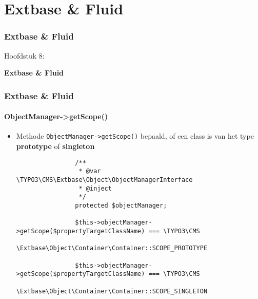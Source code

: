 %

\section{Extbase \& Fluid}
\begin{frame}[fragile]
	\frametitle{Extbase \& Fluid}

	\begin{center}\huge{Hoofdstuk 8:}\end{center}
	\begin{center}\huge{\color{typo3darkgrey}\textbf{Extbase \& Fluid}}\end{center}

\end{frame}


\begin{frame}[fragile]
	\frametitle{Extbase \& Fluid}
	\framesubtitle{ObjectManager->getScope()}

	\lstset{
		basicstyle=\tiny\ttfamily
	}

	\begin{itemize}
		\item Methode \texttt{ObjectManager->getScope()} bepaald,\newline
			of een class is van het type \textbf{prototype} of \textbf{singleton}

			\begin{lstlisting}
				/**
				 * @var \TYPO3\CMS\Extbase\Object\ObjectManagerInterface
				 * @inject
				 */
				protected $objectManager;

				$this->objectManager->getScope($propertyTargetClassName) === \TYPO3\CMS
				\Extbase\Object\Container\Container::SCOPE_PROTOTYPE

				$this->objectManager->getScope($propertyTargetClassName) === \TYPO3\CMS
				\Extbase\Object\Container\Container::SCOPE_SINGLETON
			\end{lstlisting}

	\end{itemize}

\end{frame}

